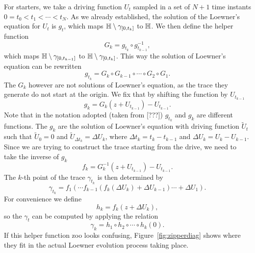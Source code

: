 For starters, we take a driving function $U_t$ sampled in a set of $N+1$ time
instants $0=t_0<t_1<\cdots<t_N$. As we already established, the solution of the
Loewner's equation for $U_t$ is $g_t$, which maps
$\mathbb{H}\setminus\gamma_{\left[0,t_{k}\right]}$ to $\mathbb{H}$. We then define the
helper function
\begin{equation}
    G_{k}=g_{t_{k}}\circ g_{t_{k-1}}^{-1},
\end{equation}
which maps $\mathbb{H}\setminus\gamma_{\left[0,t_{k-1}\right]}$ to
$\mathbb{H}\setminus\gamma_{\left[0,t_{k}\right]}$. This way the solution of Loewner's
equation can be rewritten
\begin{equation}
    g_{t_{k}}=G_{k}\circ G_{k-1}\circ\cdots\circ G_{2}\circ G_{1}.
\end{equation}
The $G_k$ however are not solutions of Loewner's equation, as the trace they
generate do not start at the origin. We fix that by shifting the function by
$U_{t_{k-1}}$
\begin{equation}
    g_{k}=G_{k}\left(z+U_{t_{k-1}}\right)-U_{t_{k-1}}.
\end{equation}
Note that in the notation adopted (taken from [???]) $g_{t_k}$ and $g_k$ are
different functions. The $g_k$ are the solution of Loewner's equation with
driving function $\tilde{U}_t$ such that $\tilde{U}_0=0$ and $\tilde{U}_{\Delta
t_k} = \Delta U_k$, where $\Delta t_k = t_{k} - t_{k-1}$ and $\Delta U_{k}
= U_{k} - U_{k-1}$. Since we are trying to construct the trace starting from
the drive, we need to take the inverse of $g_k$
\begin{equation}
    f_{k}=G_{k}^{-1}\left(z+U_{t_{k-1}}\right)-U_{t_{k-1}}.
\end{equation}
The $k$-th point of the trace $\gamma_{t_k}$ is then determined by 
\begin{equation}
    \gamma_{t_k} = f_1(\cdots f_{k-1}(f_k(\Delta U_k)+\Delta U_{k-1})\cdots+\Delta U_1).
\end{equation}
For convenience we define
\begin{equation}
    h_{k}=f_{k}\left(z+\Delta U_{k}\right),
\end{equation}
so the $\gamma_t$ can be computed by applying the relation
\begin{equation}
    \label{eq:zip}
    \gamma_{k}=h_{1}\circ h_{2}\circ\cdots\circ h_{k}\left(0\right).
\end{equation}
If this helper function zoo looks confusing, Figure~\ref{fig:zipperdiag} shows
where they fit in the actual Loewner evolution process taking place.

